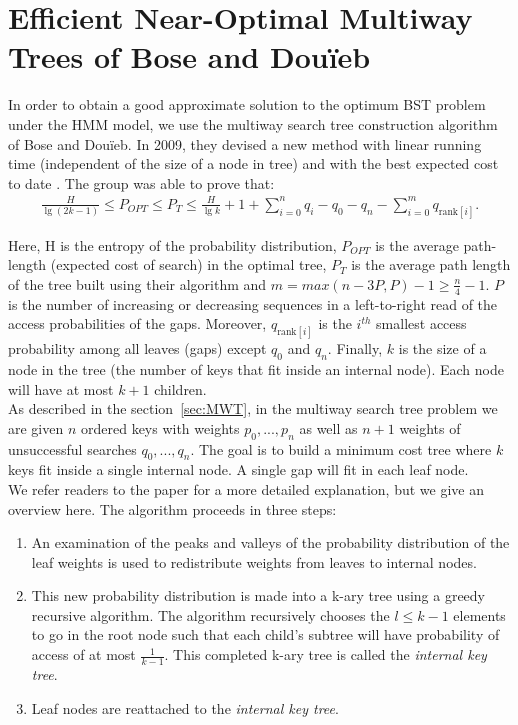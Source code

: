 \documentclass[letterpaper,12pt,titlepage,oneside,final]{book}
\theoremstyle{plain}
\begin{document}
\section{Efficient Near-Optimal Multiway Trees of Bose and Dou\"{i}eb}\label{43}

In order to obtain a good approximate solution to the optimum BST problem under the HMM model, we use the multiway search tree construction algorithm of Bose and Dou\"{i}eb. In 2009, they devised a new method with linear running time (independent of the size of a node in tree) and with the best expected cost to date \cite{bose2009efficient}. The group was able to prove that:
\begin{align*}
\frac{H}{\lg(2k-1)} \leq P_{OPT} \leq P_T \leq \frac{H}{\lg k} + 1 + \sum_{i=0}^n q_i - q_0 - q_n - \sum_{i=0}^m q_{\text{rank}[i]}.
\end{align*}

Here, H is the entropy of the probability distribution, $P_{OPT}$ is the average path-length (expected cost of search) in the optimal tree, $P_T$ is the average path length of the tree built using their algorithm and $m=max({n-3P,P})-1 \geq \frac{n}{4} - 1$. $P$ is the number of increasing or decreasing sequences in a left-to-right read of the access probabilities of the gaps. Moreover, $q_{\text{rank}[i]}$ is the $i^{th}$ smallest access probability among all leaves (gaps) except $q_0$ and $q_n$. Finally, $k$ is the size of a node in the tree (the number of keys that fit inside an internal node). Each node will have at most $k+1$ children. \\

As described in the section~\ref{sec:MWT}, in the multiway search tree problem we are given $n$ ordered keys with weights $p_0, ..., p_n$ as well as $n+1$ weights of unsuccessful searches $q_0,...,q_n$. The goal is to build a minimum cost tree where $k$ keys fit inside a single internal node. A single gap will fit in each leaf node. \\
 
We refer readers to the paper \cite{bose2009efficient} for a more detailed explanation, but we give an overview here. The algorithm proceeds in three steps: 
 
\begin{enumerate}
\item An examination of the peaks and valleys of the probability distribution of the leaf weights is used to redistribute weights from leaves to internal nodes. 

\item This new probability distribution is made into a k-ary tree using a greedy recursive algorithm. The algorithm recursively chooses the $l \leq k-1$ elements to go in the root node such that each child's subtree will have probability of access of at most $\frac{1}{k-1}$. This completed k-ary tree is called the \textit{internal key tree}. 

\item Leaf nodes are reattached to the \textit{internal key tree}.
\end{enumerate}
\end{document}
